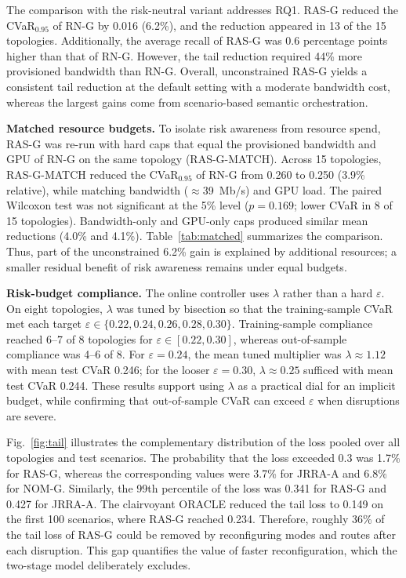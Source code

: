 \documentclass[letterpaper,journal]{IEEEtran}
\begin{document}
The comparison with the risk-neutral variant addresses RQ1. RAS-G reduced the CVaR$_{0.95}$ of RN-G by 0.016 (6.2\%), and the reduction appeared in 13 of the 15 topologies. Additionally, the average recall of RAS-G was 0.6 percentage points higher than that of RN-G. However, the tail reduction required 44\% more provisioned bandwidth than RN-G. Overall, unconstrained RAS-G yields a consistent tail reduction at the default setting with a moderate bandwidth cost, whereas the largest gains come from scenario-based semantic orchestration.

\textbf{Matched resource budgets.} To isolate risk awareness from resource spend, RAS-G was re-run with hard caps that equal the provisioned bandwidth and GPU of RN-G on the same topology (RAS-G-MATCH). Across 15 topologies, RAS-G-MATCH reduced the CVaR$_{0.95}$ of RN-G from 0.260 to 0.250 (3.9\% relative), while matching bandwidth ($\approx$39~Mb/s) and GPU load. The paired Wilcoxon test was not significant at the 5\% level ($p=0.169$; lower CVaR in 8 of 15 topologies). Bandwidth-only and GPU-only caps produced similar mean reductions (4.0\% and 4.1\%). Table~\ref{tab:matched} summarizes the comparison. Thus, part of the unconstrained 6.2\% gain is explained by additional resources; a smaller residual benefit of risk awareness remains under equal budgets.

\textbf{Risk-budget compliance.} The online controller uses $\lambda$ rather than a hard $\varepsilon$. On eight topologies, $\lambda$ was tuned by bisection so that the training-sample CVaR met each target $\varepsilon\in\{0.22,0.24,0.26,0.28,0.30\}$. Training-sample compliance reached 6--7 of 8 topologies for $\varepsilon\in[0.22,0.30]$, whereas out-of-sample compliance was 4--6 of 8. For $\varepsilon=0.24$, the mean tuned multiplier was $\lambda\approx1.12$ with mean test CVaR 0.246; for the looser $\varepsilon=0.30$, $\lambda\approx0.25$ sufficed with mean test CVaR 0.244. 
These results support using $\lambda$ as a practical dial for an implicit budget, while confirming that out-of-sample CVaR can exceed $\varepsilon$ when disruptions are severe.

Fig.~\ref{fig:tail} illustrates the complementary distribution of the loss pooled over all topologies and test scenarios. The probability that the loss exceeded 0.3 was 1.7\% for RAS-G, whereas the corresponding values were 3.7\% for JRRA-A and 6.8\% for NOM-G. Similarly, the 99th percentile of the loss was 0.341 for RAS-G and 0.427 for JRRA-A. The clairvoyant ORACLE reduced the tail loss to 0.149 on the first 100 scenarios, where RAS-G reached 0.234. Therefore, roughly 36\% of the tail loss of RAS-G could be removed by reconfiguring modes and routes after each disruption. This gap quantifies the value of faster reconfiguration, which the two-stage model deliberately excludes.
\end{document}
